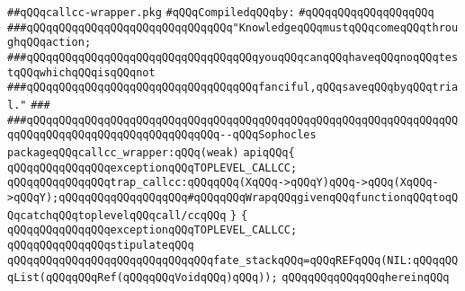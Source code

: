 \label{src/lib/compiler/execution/main/callcc-wrapper.pkg}
\verb|##qQQqcallcc-wrapper.pkg|\newline
\newline
\verb|#qQQqCompiledqQQqby:|\newline
\verb|#qQQqqQQqqQQqqQQqqQQq|\newline
\newline
\newline
\newline
\verb|###qQQqqQQqqQQqqQQqqQQqqQQqqQQqqQQq"KnowledgeqQQqmustqQQqcomeqQQqthroughqQQqaction;|\newline
\verb|###qQQqqQQqqQQqqQQqqQQqqQQqqQQqqQQqqQQqyouqQQqcanqQQqhaveqQQqnoqQQqtestqQQqwhichqQQqisqQQqnot|\newline
\verb|###qQQqqQQqqQQqqQQqqQQqqQQqqQQqqQQqqQQqfanciful,qQQqsaveqQQqbyqQQqtrial."|\newline
\verb|###|\newline
\verb|###qQQqqQQqqQQqqQQqqQQqqQQqqQQqqQQqqQQqqQQqqQQqqQQqqQQqqQQqqQQqqQQqqQQqqQQqqQQqqQQqqQQqqQQqqQQqqQQqqQQq--qQQqSophocles|\newline
\newline
\newline
\newline
\verb|packageqQQqcallcc_wrapper:qQQq(weak)|\newline
\verb|apiqQQq{|\newline
\verb|qQQqqQQqqQQqqQQqexceptionqQQqTOPLEVEL_CALLCC;|\newline
\verb|qQQqqQQqqQQqqQQqtrap_callcc:qQQqqQQq(XqQQq->qQQqY)qQQq->qQQq(XqQQq->qQQqY);qQQqqQQqqQQqqQQqqQQq#qQQqqQQqWrapqQQqgivenqQQqfunctionqQQqtoqQQqcatchqQQqtoplevelqQQqcall/ccqQQq|\newline
\verb|}|\newline
\verb|{|\newline
\verb|qQQqqQQqqQQqqQQqexceptionqQQqTOPLEVEL_CALLCC;|\newline
\newline
\verb|qQQqqQQqqQQqqQQqstipulateqQQq|\newline
\newline
\verb|qQQqqQQqqQQqqQQqqQQqqQQqqQQqqQQqfate_stackqQQq=qQQqREFqQQq(NIL:qQQqqQQqList(qQQqqQQqRef(qQQqqQQqVoidqQQq)qQQq));|\newline
\newline
\verb|qQQqqQQqqQQqqQQqhereinqQQq|\newline
\newline
